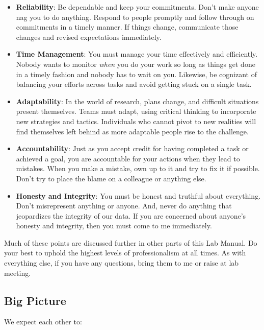 \documentclass[letterpaper,11pt,oneside]{memoir}
\begin{document}
\begin{itemize}[noitemsep]
\item \textbf{Reliability}: Be dependable and keep your commitments. Don’t make anyone nag you to do anything. Respond to people promptly and follow through on commitments in a timely manner. If things change, communicate those changes and revised expectations immediately. 
\item \textbf{Time Management}: You must manage your time effectively and efficiently. Nobody wants to monitor \textit{when} you do your work so long as things get done in a timely fashion and nobody has to wait on you. Likewise, be cognizant of balancing your efforts across tasks and avoid getting stuck on a single task.
\item \textbf{Adaptability}: In the world of research, plans change, and difficult situations present themselves. Teams must adapt, using critical thinking to incorporate new strategies and tactics. Individuals who cannot pivot to new realities will find themselves left behind as more adaptable people rise to the challenge.
\item \textbf{Accountability}: Just as you accept credit for having completed a task or achieved a goal, you are accountable for your actions when they lead to mistakes. When you make a mistake, own up to it and try to fix it if possible. Don't try to place the blame on a colleague or anything else. 
\item \textbf{Honesty and Integrity}: You must be honest and truthful about everything. Don’t misrepresent anything or anyone. And, never do anything that jeopardizes the integrity of our data. If you are concerned about anyone’s honesty and integrity, then you must come to me immediately. 
\end{itemize}

Much of these points are discussed further in other parts of this Lab Manual. Do your best to uphold the highest levels of professionalism at all times. As with everything else, if you have any questions, bring them to me or raise at lab meeting.



\subsection{Big Picture}

We expect each other to:
\end{document}
